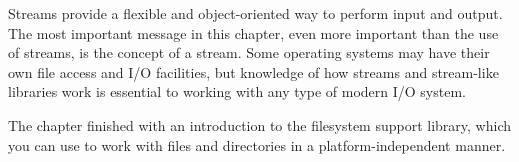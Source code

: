 

Streams provide a flexible and object-oriented way to perform input and output. The most important message in this chapter, even more important than the use of streams, is the concept of a stream. Some operating systems may have their own file access and I/O facilities, but knowledge of how streams and stream-like libraries work is essential to working with any type of modern I/O system.

The chapter finished with an introduction to the filesystem support library, which you can use to
work with files and directories in a platform-independent manner.

